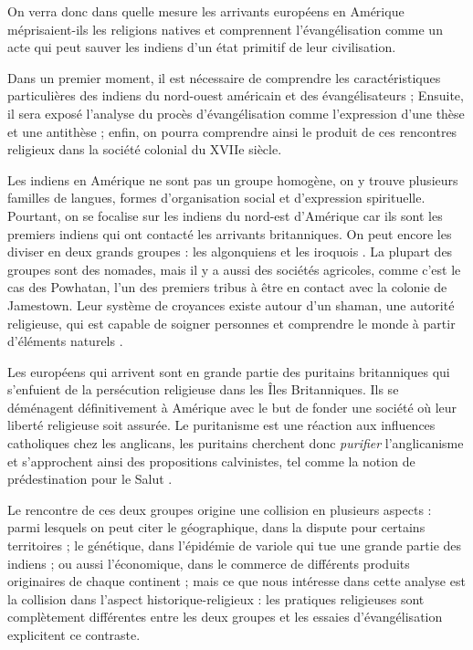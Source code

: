 \documentclass[12pt]{article}
\begin{document}
On verra donc dans quelle mesure les arrivants européens en Amérique méprisaient-ils les religions natives et comprennent l'évangélisation comme un acte qui peut sauver les indiens d'un état primitif de leur civilisation.

Dans un premier moment, il est nécessaire de comprendre les caractéristiques particulières des indiens du nord-ouest américain et des évangélisateurs ; Ensuite, il sera exposé l'analyse du procès d'évangélisation comme l'expression d'une thèse et une antithèse ; enfin, on pourra comprendre ainsi le produit de ces rencontres religieux dans la société colonial du XVIIe siècle.

Les indiens en Amérique ne sont pas un groupe homogène, on y trouve plusieurs familles de langues, formes d'organisation social et d'expression spirituelle. Pourtant, on se focalise sur les indiens du nord-est d'Amérique car ils sont les premiers indiens qui ont contacté les arrivants britanniques. On peut encore les diviser en deux grands groupes : les algonquiens et les iroquois \cite{britt-2}. La plupart des groupes sont des nomades, mais il y a aussi des sociétés agricoles, comme c'est le cas des Powhatan, l'un des premiers tribus à être en contact avec la colonie de Jamestown. Leur système de croyances existe autour d'un shaman, une autorité religieuse, qui est capable de soigner personnes et comprendre le monde à partir d'éléments naturels \cite{poter-3}.

Les européens qui arrivent sont en grande partie des puritains britanniques qui s'enfuient de la persécution religieuse dans les Îles Britanniques. Ils se déménagent définitivement à Amérique avec le but de fonder une société où leur liberté religieuse soit assurée. Le puritanisme est une réaction aux influences catholiques chez les anglicans, les puritains cherchent donc \emph{purifier} l'anglicanisme et s'approchent ainsi des propositions calvinistes, tel comme la notion de prédestination pour le Salut \cite{britt2-4}.

Le rencontre de ces deux groupes origine une collision en plusieurs aspects : parmi lesquels on peut citer le géographique, dans la dispute pour certains territoires ; le génétique, dans l'épidémie de variole qui tue une grande partie des indiens ; ou aussi l'économique, dans le commerce de différents produits originaires de chaque continent ; mais ce que nous intéresse dans cette analyse est la collision dans l'aspect historique-religieux : les pratiques religieuses sont complètement différentes entre les deux groupes et les essaies d'évangélisation explicitent ce contraste.
\end{document}

